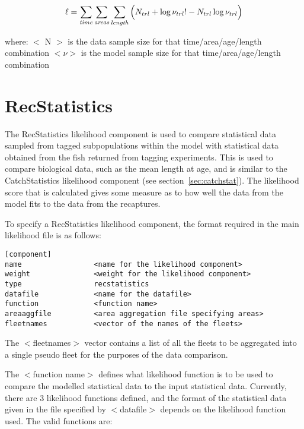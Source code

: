 \documentclass [a4paper, 10pt]{book}
\begin{document}
\begin{equation}\label{eq:recap1}
\ell = \sum_{\it time}\sum_{\it areas}\sum_{\it length} \Big( N_{trl} + \log \nu_{trl}! - N_{trl} \log \nu_{trl} \Big)
\end{equation}

where:\newline
$<$ N $>$ is the data sample size for that time/area/age/length combination\newline
$<\nu>$ is the model sample size for that time/area/age/length combination

\section{RecStatistics}\label{sec:recstat}
The RecStatistics likelihood component is used to compare statistical data sampled from tagged subpopulations within the model with statistical data obtained from the fish returned from tagging experiments.  This is used to compare biological data, such as the mean length at age, and is similar to the CatchStatistics likelihood component (see section~\ref{sec:catchstat}).  The likelihood score that is calculated gives some measure as to how well the data from the model fits to the data from the recaptures.

\bigskip
To specify a RecStatistics likelihood component, the format required in the main likelihood file is as follows:

{\small\begin{verbatim}
[component]
name                 <name for the likelihood component>
weight               <weight for the likelihood component>
type                 recstatistics
datafile             <name for the datafile>
function             <function name>
areaaggfile          <area aggregation file specifying areas>
fleetnames           <vector of the names of the fleets>
\end{verbatim}}

The $<$fleetnames$>$ vector contains a list of all the fleets to be aggregated into a single pseudo fleet for the purposes of the data comparison.

\bigskip
The $<$function name$>$ defines what likelihood function is to be used to compare the modelled statistical data to the input statistical data.  Currently, there are 3 likelihood functions defined, and the format of the statistical data given in the file specified by $<$datafile$>$ depends on the likelihood function used.  The valid functions are:
\end{document}
